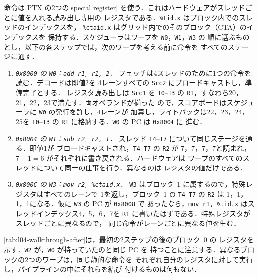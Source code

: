 \documentclass[../main.tex]{subfiles}
\begin{document}
命令は PTX の2つの[special register]
を使う．これはハードウェアがスレッドごとに値を入れる読み出し専用の
レジスタである．\texttt{\%tid.x} はブロック内でのスレッドのインデックスを，
\texttt{\%ctaid.x} はグリッド内でのそのブロック（CTA）のインデックスを
保持する．スケジューラはワープを \texttt{W0}，\texttt{W1}，\texttt{W3} の
順に選ぶものとし，以下の各ステップでは，次のワープを考える前に命令を
すべてのステージに通す．
\begin{enumerate}
  \item \emph{\texttt{0x8000} の \texttt{W0}：\texttt{add r1, r1, 2}．}
    フェッチは4スレッドのために1つの命令を読む．デコードは即値2を
    4レーンすべての \texttt{Src2} にブロードキャストし，準備完了とする．
    レジスタ読み出しは \texttt{Src1} を \texttt{T0}--\texttt{T3} の
    \texttt{R1}，すなわち20，21，22，23で満たす．両オペランドが揃った
    ので，スコアボードはスケジューラに \texttt{W0} の発行を許し，4レーンが
    加算し，ライトバックは22，23，24，25を \texttt{T0}--\texttt{T3} の
    \texttt{R1} に格納する．\texttt{W0} の PC は \texttt{0x8004} に
    進む．
  \item \emph{\texttt{0x8004} の \texttt{W1}：\texttt{sub r2, r2, 1}．}
    スレッド \texttt{T4}--\texttt{T7} について同じステージを通る．即値1が
    ブロードキャストされ，\texttt{T4}--\texttt{T7} の \texttt{R2} が
    7，7，7，7と読まれ，$7 - 1 = 6$ がそれぞれに書き戻される．ハードウェアは
    ワープのすべてのスレッドについて同一の仕事を行う．異なるのは
    レジスタの値だけである．
  \item \emph{\texttt{0x800C} の \texttt{W3}：\texttt{mov r2, \%ctaid.x}．}
    \texttt{W3} はブロック~1 に属するので，特殊レジスタはすべてのレーンで
    1を返し，ブロック~1 の \texttt{T4}--\texttt{T7} の \texttt{R2} は
    1，1，1，1になる．仮に \texttt{W3} の PC が \texttt{0x8008} で
    あったなら，\texttt{mov r1, \%tid.x} はスレッドインデックス4，5，6，7を
    \texttt{R1} に書いたはずである．特殊レジスタがスレッドごとに異なるので，
    同じ命令がレーンごとに異なる値を生む．
\end{enumerate}
\cref{tab:l04-walkthrough-after}は，最初の2ステップの後のブロック~0 の
レジスタを示す．\texttt{W2} が，\texttt{W0} が持っていたのと同じ PC を
持つことに注意する．異なるブロックの2つのワープは，同じ静的な命令を
それぞれ自分のレジスタに対して実行し，パイプラインの中にそれらを結び
付けるものは何もない．
\end{document}
